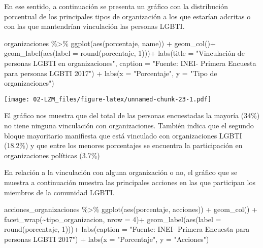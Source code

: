 \documentclass[
]{book}
\newenvironment{Shaded}{\begin{snugshade}}{\end{snugshade}}
\newcommand{\AttributeTok}[1]{\textcolor[rgb]{0.77,0.63,0.00}{#1}}
\newcommand{\DecValTok}[1]{\textcolor[rgb]{0.00,0.00,0.81}{#1}}
\newcommand{\FunctionTok}[1]{\textcolor[rgb]{0.00,0.00,0.00}{#1}}
\newcommand{\NormalTok}[1]{#1}
\newcommand{\SpecialCharTok}[1]{\textcolor[rgb]{0.00,0.00,0.00}{#1}}
\newcommand{\StringTok}[1]{\textcolor[rgb]{0.31,0.60,0.02}{#1}}
\theoremstyle{definition}
\theoremstyle{definition}
\theoremstyle{definition}
\theoremstyle{definition}
\theoremstyle{remark}
\begin{document}
En ese sentido, a continuación se presenta un gráfico con la distribución porcentual de los principales tipos de organización a los que estarían adcritas o con las que mantendrían vinculación las personas LGBTI.

\begin{Shaded}
\begin{Highlighting}[]
\NormalTok{organizaciones }\SpecialCharTok{\%\textgreater{}\%} 
  \FunctionTok{ggplot}\NormalTok{(}\FunctionTok{aes}\NormalTok{(porcentaje, name)) }\SpecialCharTok{+}
  \FunctionTok{geom\_col}\NormalTok{()}\SpecialCharTok{+}
  \FunctionTok{geom\_label}\NormalTok{(}\FunctionTok{aes}\NormalTok{(}\AttributeTok{label =} \FunctionTok{round}\NormalTok{(porcentaje, }\DecValTok{1}\NormalTok{)))}\SpecialCharTok{+}
    \FunctionTok{labs}\NormalTok{(}\AttributeTok{title =} \StringTok{"Vinculación de personas LGBTI en organizaciones"}\NormalTok{, }
       \AttributeTok{caption =} \StringTok{"Fuente: INEI{-} Primera Encuesta para personas LGBTI 2017"}\NormalTok{) }\SpecialCharTok{+}
  \FunctionTok{labs}\NormalTok{(}\AttributeTok{x =} \StringTok{"Porcentaje"}\NormalTok{,}
       \AttributeTok{y =} \StringTok{"Tipo de organizaciones"}\NormalTok{)}
\end{Highlighting}
\end{Shaded}

\texttt{[image: 02-LZM\_files/figure-latex/unnamed-chunk-23-1.pdf]}

El gráfico nos muestra que del total de las personas encuestadas la mayoría (34\%) no tiene ninguna vinculación con organizaciones. También indica que el segundo bloque mayoritario manifiesta que está vinculado con organizaciones LGBTI (18.2\%) y que entre los menores porcentajes se encuentra la participación en organizaciones políticas (3.7\%)

En relación a la vinculación con alguna organización o no, el gráfico que se muestra a continuación muestra las principales acciones en las que participan los miembros de la comunidad LGBTI.

\begin{Shaded}
\begin{Highlighting}[]
\NormalTok{acciones\_organizaciones }\SpecialCharTok{\%\textgreater{}\%} 
  \FunctionTok{ggplot}\NormalTok{(}\FunctionTok{aes}\NormalTok{(porcentaje, acciones)) }\SpecialCharTok{+}
  \FunctionTok{geom\_col}\NormalTok{() }\SpecialCharTok{+}
  \FunctionTok{facet\_wrap}\NormalTok{(}\SpecialCharTok{\textasciitilde{}}\NormalTok{tipo\_organizacion, }\AttributeTok{nrow =} \DecValTok{4}\NormalTok{)}\SpecialCharTok{+}
  \FunctionTok{geom\_label}\NormalTok{(}\FunctionTok{aes}\NormalTok{(}\AttributeTok{label =} \FunctionTok{round}\NormalTok{(porcentaje, }\DecValTok{1}\NormalTok{)))}\SpecialCharTok{+}
  \FunctionTok{labs}\NormalTok{(}\AttributeTok{caption =} \StringTok{"Fuente: INEI{-} Primera Encuesta para personas LGBTI 2017"}\NormalTok{) }\SpecialCharTok{+}
  \FunctionTok{labs}\NormalTok{(}\AttributeTok{x =} \StringTok{"Porcentaje"}\NormalTok{,}
       \AttributeTok{y =} \StringTok{"Acciones"}\NormalTok{)}
\end{Highlighting}
\end{Shaded}
\end{document}
